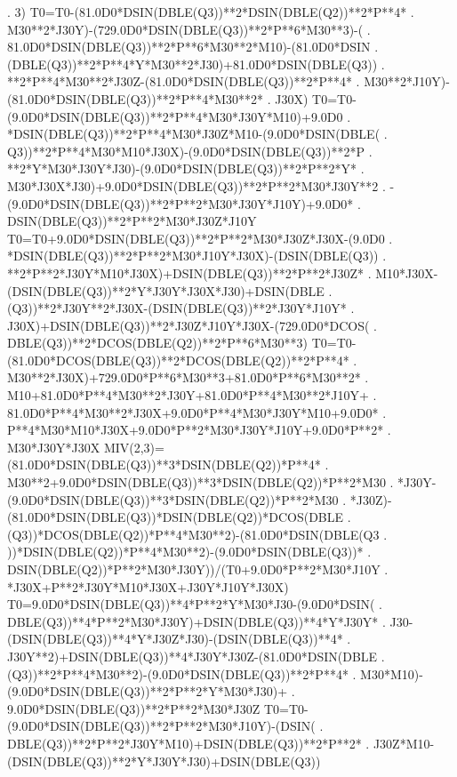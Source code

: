 \begin{framedverbatim}
     . 3)
      T0=T0-(81.0D0*DSIN(DBLE(Q3))**2*DSIN(DBLE(Q2))**2*P**4*
     . M30**2*J30Y)-(729.0D0*DSIN(DBLE(Q3))**2*P**6*M30**3)-(
     . 81.0D0*DSIN(DBLE(Q3))**2*P**6*M30**2*M10)-(81.0D0*DSIN
     . (DBLE(Q3))**2*P**4*Y*M30**2*J30)+81.0D0*DSIN(DBLE(Q3))
     . **2*P**4*M30**2*J30Z-(81.0D0*DSIN(DBLE(Q3))**2*P**4*
     . M30**2*J10Y)-(81.0D0*DSIN(DBLE(Q3))**2*P**4*M30**2*
     . J30X)
      T0=T0-(9.0D0*DSIN(DBLE(Q3))**2*P**4*M30*J30Y*M10)+9.0D0
     . *DSIN(DBLE(Q3))**2*P**4*M30*J30Z*M10-(9.0D0*DSIN(DBLE(
     . Q3))**2*P**4*M30*M10*J30X)-(9.0D0*DSIN(DBLE(Q3))**2*P
     . **2*Y*M30*J30Y*J30)-(9.0D0*DSIN(DBLE(Q3))**2*P**2*Y*
     . M30*J30X*J30)+9.0D0*DSIN(DBLE(Q3))**2*P**2*M30*J30Y**2
     . -(9.0D0*DSIN(DBLE(Q3))**2*P**2*M30*J30Y*J10Y)+9.0D0*
     . DSIN(DBLE(Q3))**2*P**2*M30*J30Z*J10Y
      T0=T0+9.0D0*DSIN(DBLE(Q3))**2*P**2*M30*J30Z*J30X-(9.0D0
     . *DSIN(DBLE(Q3))**2*P**2*M30*J10Y*J30X)-(DSIN(DBLE(Q3))
     . **2*P**2*J30Y*M10*J30X)+DSIN(DBLE(Q3))**2*P**2*J30Z*
     . M10*J30X-(DSIN(DBLE(Q3))**2*Y*J30Y*J30X*J30)+DSIN(DBLE
     . (Q3))**2*J30Y**2*J30X-(DSIN(DBLE(Q3))**2*J30Y*J10Y*
     . J30X)+DSIN(DBLE(Q3))**2*J30Z*J10Y*J30X-(729.0D0*DCOS(
     . DBLE(Q3))**2*DCOS(DBLE(Q2))**2*P**6*M30**3)
      T0=T0-(81.0D0*DCOS(DBLE(Q3))**2*DCOS(DBLE(Q2))**2*P**4*
     . M30**2*J30X)+729.0D0*P**6*M30**3+81.0D0*P**6*M30**2*
     . M10+81.0D0*P**4*M30**2*J30Y+81.0D0*P**4*M30**2*J10Y+
     . 81.0D0*P**4*M30**2*J30X+9.0D0*P**4*M30*J30Y*M10+9.0D0*
     . P**4*M30*M10*J30X+9.0D0*P**2*M30*J30Y*J10Y+9.0D0*P**2*
     . M30*J30Y*J30X
      MIV(2,3)=(81.0D0*DSIN(DBLE(Q3))**3*DSIN(DBLE(Q2))*P**4*
     . M30**2+9.0D0*DSIN(DBLE(Q3))**3*DSIN(DBLE(Q2))*P**2*M30
     . *J30Y-(9.0D0*DSIN(DBLE(Q3))**3*DSIN(DBLE(Q2))*P**2*M30
     . *J30Z)-(81.0D0*DSIN(DBLE(Q3))*DSIN(DBLE(Q2))*DCOS(DBLE
     . (Q3))*DCOS(DBLE(Q2))*P**4*M30**2)-(81.0D0*DSIN(DBLE(Q3
     . ))*DSIN(DBLE(Q2))*P**4*M30**2)-(9.0D0*DSIN(DBLE(Q3))*
     . DSIN(DBLE(Q2))*P**2*M30*J30Y))/(T0+9.0D0*P**2*M30*J10Y
     . *J30X+P**2*J30Y*M10*J30X+J30Y*J10Y*J30X)
      T0=9.0D0*DSIN(DBLE(Q3))**4*P**2*Y*M30*J30-(9.0D0*DSIN(
     . DBLE(Q3))**4*P**2*M30*J30Y)+DSIN(DBLE(Q3))**4*Y*J30Y*
     . J30-(DSIN(DBLE(Q3))**4*Y*J30Z*J30)-(DSIN(DBLE(Q3))**4*
     . J30Y**2)+DSIN(DBLE(Q3))**4*J30Y*J30Z-(81.0D0*DSIN(DBLE
     . (Q3))**2*P**4*M30**2)-(9.0D0*DSIN(DBLE(Q3))**2*P**4*
     . M30*M10)-(9.0D0*DSIN(DBLE(Q3))**2*P**2*Y*M30*J30)+
     . 9.0D0*DSIN(DBLE(Q3))**2*P**2*M30*J30Z
      T0=T0-(9.0D0*DSIN(DBLE(Q3))**2*P**2*M30*J10Y)-(DSIN(
     . DBLE(Q3))**2*P**2*J30Y*M10)+DSIN(DBLE(Q3))**2*P**2*
     . J30Z*M10-(DSIN(DBLE(Q3))**2*Y*J30Y*J30)+DSIN(DBLE(Q3))

\end{framedverbatim}
